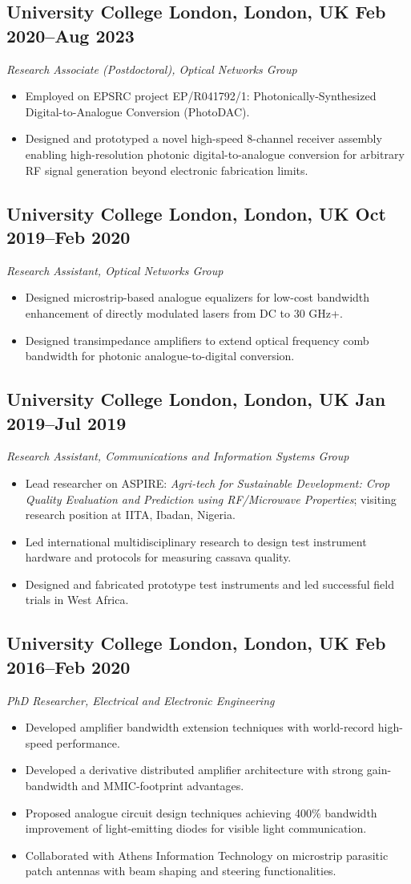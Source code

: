 \documentclass[a4paper,11pt]{article}
\newcommand{\role}[3]{%
    \subsection*{#1 \hfill \normalfont #2}
    \vspace{-0.5mm}
    {\itshape #3}
    \vspace{2mm}
}
\begin{document}
\role
{University College London, London, UK}
{Feb 2020--Aug 2023}
{Research Associate (Postdoctoral), Optical Networks Group}

\begin{itemize}
    \item Employed on EPSRC project EP/R041792/1: Photonically-Synthesized Digital-to-Analogue Conversion (PhotoDAC).
    \item Designed and prototyped a novel high-speed 8-channel receiver assembly enabling high-resolution photonic digital-to-analogue conversion for arbitrary RF signal generation beyond electronic fabrication limits.
\end{itemize}

\role
{University College London, London, UK}
{Oct 2019--Feb 2020}
{Research Assistant, Optical Networks Group}

\begin{itemize}
    \item Designed microstrip-based analogue equalizers for low-cost bandwidth enhancement of directly modulated lasers from DC to 30 GHz+.
    \item Designed transimpedance amplifiers to extend optical frequency comb bandwidth for photonic analogue-to-digital conversion.
\end{itemize}

\role
{University College London, London, UK}
{Jan 2019--Jul 2019}
{Research Assistant, Communications and Information Systems Group}

\begin{itemize}
    \item Lead researcher on ASPIRE: \emph{Agri-tech for Sustainable Development: Crop Quality Evaluation and Prediction using RF/Microwave Properties}; visiting research position at IITA, Ibadan, Nigeria.
    \item Led international multidisciplinary research to design test instrument hardware and protocols for measuring cassava quality.
    \item Designed and fabricated prototype test instruments and led successful field trials in West Africa.
\end{itemize}

\role
{University College London, London, UK}
{Feb 2016--Feb 2020}
{PhD Researcher, Electrical and Electronic Engineering}

\begin{itemize}
    \item Developed amplifier bandwidth extension techniques with world-record high-speed performance.
    \item Developed a derivative distributed amplifier architecture with strong gain-bandwidth and MMIC-footprint advantages.
    \item Proposed analogue circuit design techniques achieving 400\% bandwidth improvement of light-emitting diodes for visible light communication.
    \item Collaborated with Athens Information Technology on microstrip parasitic patch antennas with beam shaping and steering functionalities.
\end{itemize}
\end{document}
